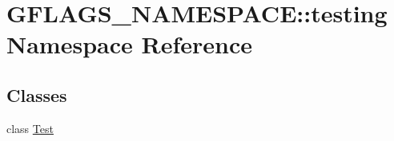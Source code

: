 \hypertarget{namespaceGFLAGS__NAMESPACE_1_1testing}{}\section{G\+F\+L\+A\+G\+S\+\_\+\+N\+A\+M\+E\+S\+P\+A\+CE\+:\+:testing Namespace Reference}
\label{namespaceGFLAGS__NAMESPACE_1_1testing}
\subsection*{Classes}
\begin{DoxyCompactItemize}
\item 
class \hyperlink{classGFLAGS__NAMESPACE_1_1testing_1_1Test}{Test}
\end{DoxyCompactItemize}
